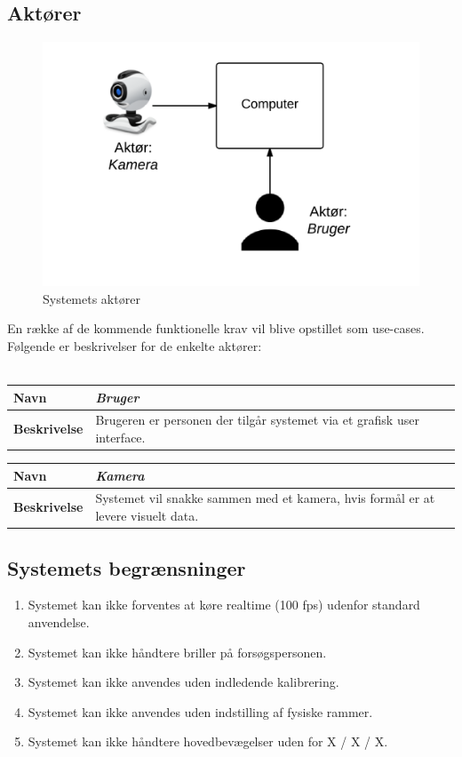 \documentclass[kravspec.tex]{subfiles}
\begin{document}
\subsection{Aktører}
\begin{figure}[h]
\centering
\includegraphics[width=0.7\linewidth]{../Actors}
\caption{Systemets aktører}
\label{fig:Actors}
\end{figure}

En række af de kommende funktionelle krav vil blive opstillet som use-cases. Følgende er beskrivelser for de enkelte aktører: \\
\\
\begin{tabular}{| l | p{10cm} |}
	\hline 
	\textbf{Navn} & \textit{Bruger} \\ \hline
	\textbf{Beskrivelse} & Brugeren er personen der tilgår systemet via et grafisk user interface.\\ \hline
\end{tabular}
\newline
\vspace*{0.7 cm}
\newline
\begin{tabular}{| l | p{10cm} |}
	\hline 
	\textbf{Navn} & \textit{Kamera} \\ \hline
	\textbf{Beskrivelse} & Systemet vil snakke sammen med et kamera, hvis formål er at levere visuelt data.\\ \hline
\end{tabular}

\subsection{Systemets begrænsninger}
\begin{enumerate}
	\item Systemet kan ikke forventes at køre realtime (100 fps) udenfor standard anvendelse.
\item 
Systemet kan ikke håndtere briller på forsøgspersonen.
\item 
Systemet kan ikke anvendes uden indledende kalibrering.
\item 
Systemet kan ikke anvendes uden indstilling af fysiske rammer.
\item 
Systemet kan ikke håndtere hovedbevægelser uden for X / X / X.
\end{enumerate}
\end{document}
